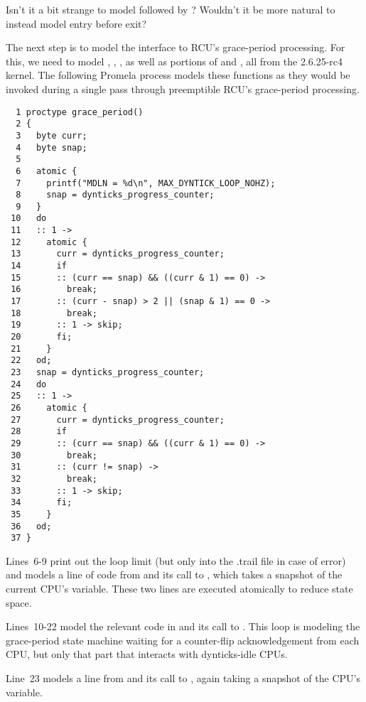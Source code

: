 \QuickQuiz{}
	Isn't it a bit strange to model 
	followed by ?
	Wouldn't it be more natural to instead model entry before exit?
 \QuickQuizEnd

The next step is to model the interface to RCU's grace-period
processing.
For this, we need to model
,
,
,
as well as portions of
 and
, all from the 2.6.25-rc4 kernel.
The following  Promela process models
these functions as they would be invoked during a single pass
through preemptible RCU's grace-period processing.

{ \scriptsize
\begin{verbatim}
  1 proctype grace_period()
  2 {
  3   byte curr;
  4   byte snap;
  5
  6   atomic {
  7     printf("MDLN = %d\n", MAX_DYNTICK_LOOP_NOHZ);
  8     snap = dynticks_progress_counter;
  9   }
 10   do
 11   :: 1 ->
 12     atomic {
 13       curr = dynticks_progress_counter;
 14       if
 15       :: (curr == snap) && ((curr & 1) == 0) ->
 16         break;
 17       :: (curr - snap) > 2 || (snap & 1) == 0 ->
 18         break;
 19       :: 1 -> skip;
 20       fi;
 21     }
 22   od;
 23   snap = dynticks_progress_counter;
 24   do
 25   :: 1 ->
 26     atomic {
 27       curr = dynticks_progress_counter;
 28       if
 29       :: (curr == snap) && ((curr & 1) == 0) ->
 30         break;
 31       :: (curr != snap) ->
 32         break;
 33       :: 1 -> skip;
 34       fi;
 35     }
 36   od;
 37 }
\end{verbatim}
}

Lines~6-9 print out the loop limit (but only into the .trail file
in case of error) and models a line of code
from  and its call to
, which takes a
snapshot of the current CPU's 
variable.
These two lines are executed atomically to reduce state space.

Lines~10-22 model the relevant code in
 and its call to
.
This loop is modeling the grace-period state machine waiting for
a counter-flip acknowledgement from each CPU, but only that part
that interacts with dynticks-idle CPUs.

Line~23 models a line from 
and its call to , again
taking a snapshot of the CPU's 
variable.

